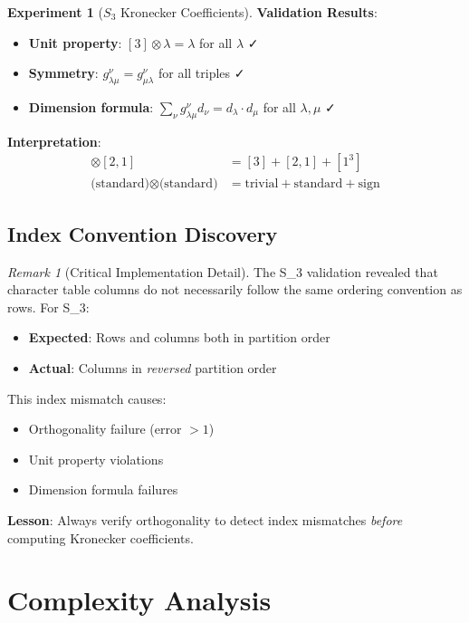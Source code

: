 \documentclass[11pt]{article}
\theoremstyle{definition}
\newtheorem{experiment}[theorem]{Experiment}
\theoremstyle{remark}
\newtheorem{remark}[theorem]{Remark}
\begin{document}
\begin{experiment}[$S_3$ Kronecker Coefficients]
\textbf{Validation Results}:
\begin{itemize}
\item \textbf{Unit property}: $[3] \otimes \lambda = \lambda$ for all $\lambda$ ✓
\item \textbf{Symmetry}: $g^\nu_{\lambda\mu} = g^\nu_{\mu\lambda}$ for all triples ✓
\item \textbf{Dimension formula}: $\sum_\nu g^\nu_{\lambda\mu} d_\nu = d_\lambda \cdot d_\mu$ for all $\lambda, \mu$ ✓
\end{itemize}

\textbf{Interpretation}:
\begin{align*}
[2,1] \otimes [2,1] &= [3] + [2,1] + [1^3] \\
\text{(standard)} \otimes \text{(standard)} &= \text{trivial} + \text{standard} + \text{sign}
\end{align*}

\end{experiment}

\subsection{Index Convention Discovery}

\begin{remark}[Critical Implementation Detail]
The S_3 validation revealed that character table columns do not necessarily follow the same ordering convention as rows. For S_3:
\begin{itemize}
\item \textbf{Expected}: Rows and columns both in partition order
\item \textbf{Actual}: Columns in \emph{reversed} partition order
\end{itemize}

This index mismatch causes:
\begin{itemize}
\item Orthogonality failure (error $> 1$)
\item Unit property violations
\item Dimension formula failures
\end{itemize}

\textbf{Lesson}: Always verify orthogonality to detect index mismatches \emph{before} computing Kronecker coefficients.
\end{remark}

\section{Complexity Analysis}
\end{document}
